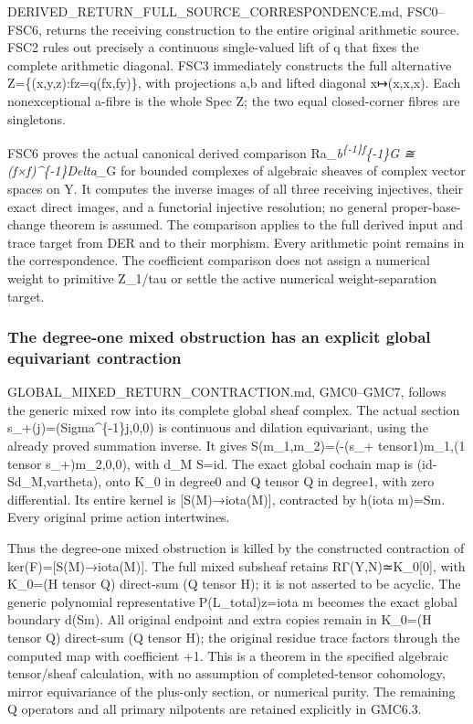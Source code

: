 DERIVED\_RETURN\_FULL\_SOURCE\_CORRESPONDENCE.md, FSC0--FSC6, returns
the receiving construction to the entire original arithmetic source.
FSC2 rules out precisely a continuous single-valued lift of q that fixes
the complete arithmetic diagonal. FSC3 immediately constructs the full
alternative Z=\{(x,y,z):fz=q(fx,fy)\}, with projections a,b and lifted
diagonal x↦(x,x,x). Each nonexceptional a-fibre is the whole Spec Z; the
two equal closed-corner fibres are singletons.

FSC6 proves the actual canonical derived comparison
Ra\_\emph{b\textsuperscript{\{-1\}f}\{-1\}G ≅ (f×f)\^{}\{-1\}Delta\_}G
for bounded complexes of algebraic sheaves of complex vector spaces on
Y. It computes the inverse images of all three receiving injectives,
their exact direct images, and a functorial injective resolution; no
general proper-base-change theorem is assumed. The comparison applies to
the full derived input and trace target from DER and to their morphism.
Every arithmetic point remains in the correspondence. The coefficient
comparison does not assign a numerical weight to primitive Z\_1/tau or
settle the active numerical weight-separation target.

\subsubsection{The degree-one mixed obstruction has an explicit global
equivariant
contraction}\label{the-degree-one-mixed-obstruction-has-an-explicit-global-equivariant-contraction}

GLOBAL\_MIXED\_RETURN\_CONTRACTION.md, GMC0--GMC7, follows the generic
mixed row into its complete global sheaf complex. The actual section
s\_+(j)=(Sigma\^{}\{-1\}j,0,0) is continuous and dilation equivariant,
using the already proved summation inverse. It gives
S(m\_1,m\_2)=(-(s\_+ tensor1)m\_1,(1 tensor s\_+)m\_2,0,0), with d\_M
S=id. The exact global cochain map is (id-Sd\_M,vartheta), onto K\_0 in
degree0 and Q tensor Q in degree1, with zero differential. Its entire
kernel is {[}S(M)→iota(M){]}, contracted by h(iota m)=Sm. Every original
prime action intertwines.

Thus the degree-one mixed obstruction is killed by the constructed
contraction of ker(F)={[}S(M)→iota(M){]}. The full mixed subsheaf
retains RΓ(Y,N)≃K\_0{[}0{]}, with K\_0=(H tensor Q) direct-sum (Q tensor
H); it is not asserted to be acyclic. The generic polynomial
representative P(L\_total)z=iota m becomes the exact global boundary
d(Sm). All original endpoint and extra copies remain in K\_0=(H tensor
Q) direct-sum (Q tensor H); the original residue trace factors through
the computed map with coefficient +1. This is a theorem in the specified
algebraic tensor/sheaf calculation, with no assumption of
completed-tensor cohomology, mirror equivariance of the plus-only
section, or numerical purity. The remaining Q operators and all primary
nilpotents are retained explicitly in GMC6.3.

